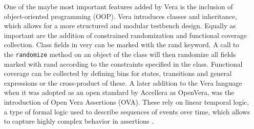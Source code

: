 \documentclass[11pt,a4paper]{report}
\newcommand{\ttt}{\texttt}
\begin{document}
One of the maybe most important features added by Vera is the inclusion of object-oriented programming (OOP). Vera
introduces classes and inheritance, which allows for a more structured and modular testbench design. Equally as
important are the addition of constrained randomization and functional coverage collection. Class fields in very can
be marked with the rand keyword. A call to the \ttt{randomize} method on an object of the class will then randomize
all fields marked with rand according to the constraints specified in the class. Functional coverage can be collected
by defining bins for states, transitions and general expressions or the cross-product of these. A later addition to
the Vera language when it was adopted as an open standard by Accellera as OpenVera, was the introduction of Open Vera
Assertions (OVA). These rely on linear temporal logic, a type of formal logic used to describe sequences of events
over time, which allows to capture highly complex behavior in assertions \cite[Sec. 7]{flake2020a}.
\end{document}
